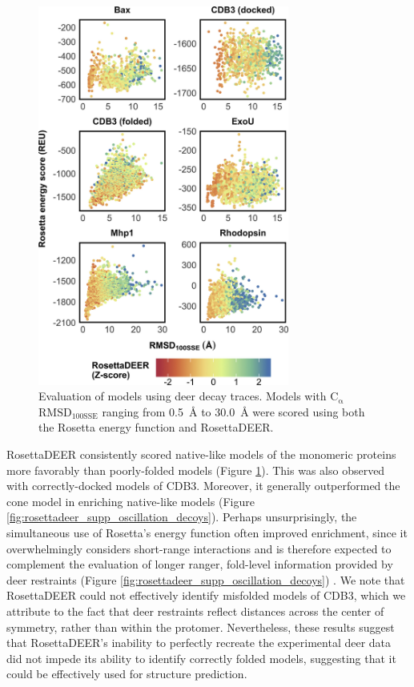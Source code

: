 \begin{figure}
    \centering
    \includegraphics[width=3.25in]{Figures/rosettadeer_main_zscores.jpg}
     \caption[Evaluation of models using \gls{deer} decay traces.]{Evaluation of models using \gls{deer} decay traces. Models with $\mathrm{C_{\upalpha}}$ $\mathrm{RMSD_{100SSE}}$ ranging from \SI{0.5}{\angstrom} to \SI{30.0}{\angstrom} were scored using both the Rosetta energy function and RosettaDEER.}
    \label{fig:rosettadeer_main_zscores}
\end{figure}

RosettaDEER consistently scored native-like models of the monomeric proteins more favorably than poorly-folded models (Figure \ref{fig:rosettadeer_main_zscores}). This was also observed with correctly-docked models of CDB3. Moreover, it generally outperformed the \gls{cone} model in enriching native-like models (Figure \ref{fig:rosettadeer_supp_oscillation_decoys}). Perhaps unsurprisingly, the simultaneous use of Rosetta’s energy function often improved enrichment, since it overwhelmingly considers short-range interactions and is therefore expected to complement the evaluation of longer ranger, fold-level information provided by \gls{deer} restraints (Figure \ref{fig:rosettadeer_supp_oscillation_decoys}) \citep*{Alford2017}. We note that RosettaDEER could not effectively identify misfolded models of CDB3, which we attribute to the fact that \gls{deer} restraints reflect distances across the center of symmetry, rather than within the protomer. Nevertheless, these results suggest that RosettaDEER’s inability to perfectly recreate the experimental \gls{deer} data did not impede its ability to identify correctly folded models, suggesting that it could be effectively used for structure prediction.



